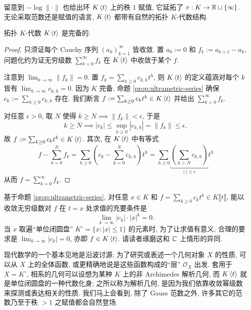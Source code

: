 留意到 $-\log \|\cdot\|$ 也给出环 $K\left\langle t \right\rangle$ 上的秩 $1$ 赋值, 它延拓了 $v: K \to \mathbb{R} \sqcup \{\infty\}$. 无论采取范数还是赋值的语言, $K\left\langle t \right\rangle$ 都带有自然的拓扑 $K$-代数结构.

\begin{lemma}\label{prop:strictly-convergent-series-2}
	拓扑 $K$-代数 $K\left\langle t \right\rangle$ 是完备的.
\end{lemma}
\begin{proof}
	只须证每个 Cauchy 序列 $(a_k)_{k=1}^\infty$ 皆收敛. 置 $a_0 := 0$ 和 $f_k := a_{k+1}-a_k$, 问题化约为证无穷级数 $\sum_{k=0}^\infty f_k$ 在 $K\left\langle t \right\rangle$ 中收敛于某个 $f$.
	
	注意到 $\lim_{k \to \infty} \|f_k\| = 0$. 置 $f_k = \sum_{h \geq 0} c_{k,h} t^h$, 则 $K\left\langle t \right\rangle$ 的定义蕴涵对每个 $k$ 皆有 $\lim_{h \to \infty} c_{k,h} = 0$. 因为 $K$ 完备, 命题 \ref{prop:ultrametric-series} 确保 $c_k := \sum_{h \geq 0} c_{k,h}$ 存在. 我们断言 $f := \sum_{k \geq 0} c_k t^k \in K\left\langle t \right\rangle$ 并给出 $\sum_{k=0}^\infty f_k$.
	
	对任意 $\epsilon > 0$, 取 $N$ 使得 $k \geq N \implies \|f_k\| < \epsilon$, 于是
	\[ k \geq N \implies |c_k| \leq \sup_{h \geq 0} |c_{k,h}| = \|f_k\| \leq \epsilon, \]
	故 $f := \sum_{k \geq 0} c_k t^k \in K\left\langle t \right\rangle$. 其次, 在 $K\left\langle t \right\rangle$ 中有等式
	\[ f - \sum_{k=0}^N f_k = \sum_{h \geq 0} \left( c_k - \sum_{k=0}^N c_{k,h} \right) t^h = \sum_{h \geq 0} \underbracket{ \left( \sum_{k > N} c_{k,h} \right)}_{|\cdot| \leq \epsilon} t^h \]
	从而 $f = \sum_{k=0}^\infty f_k$.
\end{proof}

\begin{remark}
	基于命题 \ref{prop:ultrametric-series}, 对任意 $x \in K$ 和 $f = \sum_{k \geq 0} c_k t^k \in K\llbracket t \rrbracket$, 能以收敛无穷级数对 $f$ 在 $t=x$ 处求值的充要条件是
	\[ \lim_{k \to \infty} |c_k| \cdot |x|^k = 0. \]
	当 $x$ 取遍``单位闭圆盘'' $K^\circ = \{x : |x| \leq 1 \}$ 的元素时, 为了让求值有意义, 合理的要求是 $\lim_{k \to \infty} |c_k| = 0$, 亦即 $f \in K\left\langle t \right\rangle$. 请读者琢磨这和 $\mathbb{C}$ 上情形的异同.
	
	现代数学的一个基本见地是沿波讨源: 为了研究或表述一个几何对象 $X$ 的性质, 可以从 $X$ 上的全体函数, 或更精确地说是这些函数构成的``层'' $\mathcal{O}_X$ 出发. 套用于 $X = K^\circ$, 相系的几何可以设想为某种 $K$ 上的非 Archimedes 解析几何, 而 $K\left\langle t \right\rangle$ 就是单位闭圆盘的一种代数化身; 之所以称为解析几何, 是因为我们依靠收敛幂级数来探测或表达相关的性质. 我们马上会看到, 除了 Gauss 范数之外, 许多其它的范数乃至于秩 $> 1$ 之赋值都会自然登场. 
\end{remark}

